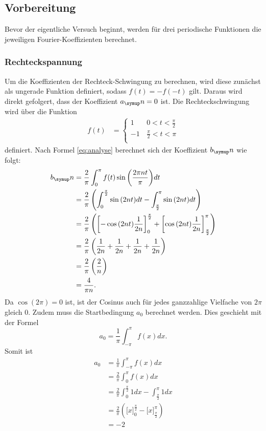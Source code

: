 \subsection{Vorbereitung}
Bevor der eigentliche Versuch beginnt, werden für drei periodische Funktionen
die jeweiligen Fourier-Koeffizienten berechnet.
\subsubsection{Rechteckspannung}
Um die Koeffizienten der Rechteck-Schwingung zu berechnen, wird diese zunächst
als ungerade Funktion definiert, sodass $f(t)=-f(-t)$ gilt. Daraus wird direkt
gefolgert, dass der Koeffizient $a_\su{n}=0$ ist.
Die Rechteckschwingung wird über die Funktion
  \begin{align}
  f(t)&=
  \begin{cases}
    1 & \, 0<t<\frac{\pi}{2} \\
    -1& \, \frac{\pi}{2}<t<\pi \\
  \end{cases}
\end{align}
definiert. Nach Formel \eqref{eq:analyse} berechnet sich der Koeffizient $b_\su{n}$
wie folgt:
\begin{align*}
  b_\su{n} &= \frac{2}{\pi}\int^\pi_0{f(t)\sin{\left(\frac{2\pi n t}{\pi}\right)} dt} \\
  &= \frac{2}{\pi}\left(\int_0^{\frac{\pi}{2}}{\sin{(2nt)} dt} -
  \int_{\frac{\pi}{2}}^\pi{\sin{(2nt)} dt}\right) \\
  &= \frac{2}{\pi}\left(\left[-\cos{(2nt)}\frac{1}{2n}\right]_0^{\frac{\pi}{2}} +
  \left[\cos{(2nt)}\frac{1}{2n}\right]_{\frac{\pi}{2}}^\pi\right) \\
  &= \frac{2}{\pi}\left(\frac{1}{2n}+\frac{1}{2n}+\frac{1}{2n}+\frac{1}{2n}\right) \\
  &= \frac{2}{\pi}\left(\frac{2}{n}\right) \\
  &= \frac{4}{\pi n}.
\end{align*}
Da $\cos{(2\pi)}=0$ ist, ist der Cosinus auch für jedes ganzzahlige Vielfache von
$2\pi$ gleich 0.
Zudem muss die Startbedingung $a_0$ berechnet werden. Dies geschieht mit der
Formel
\begin{equation*}
  a_0 = \frac{1}{\pi}\int_{-\pi}^\pi{f(x) dx}.
\end{equation*}
Somit ist
\begin{align*}
  a_0 &= \frac{1}{\pi}\int_{-\pi}^\pi{f(x) dx} \\
  &= \frac{2}{\pi}\int_0^{\pi}{f(x) dx} \\
  &= \frac{2}{\pi}\int_0^{\frac{\pi}{2}}{1 dx} -
  \int^\pi_{\frac{\pi}{2}}{1 dx} \\
  &= \frac{2}{\pi}\left(\biggl[x\biggr]_0^{\frac{\pi}{2}} -
  \biggl[x\biggr]_{\frac{\pi}{2}}^\pi\right) \\
  &= -2
\end{align*}
